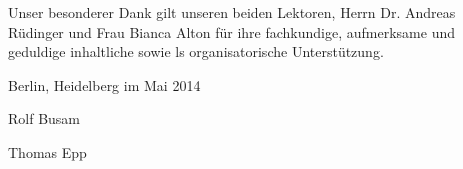 Unser besonderer Dank gilt unseren beiden Lektoren, 
Herrn Dr. Andreas Rüdinger und Frau Bianca Alton für 
ihre fachkundige, aufmerksame und geduldige inhaltliche sowie 
ls organisatorische Unterstützung. 


\bigskip
\strut\hfill Berlin, Heidelberg im Mai 2014\newline
\strut\hfill Rolf Busam\newline
\strut\hfill Thomas Epp

